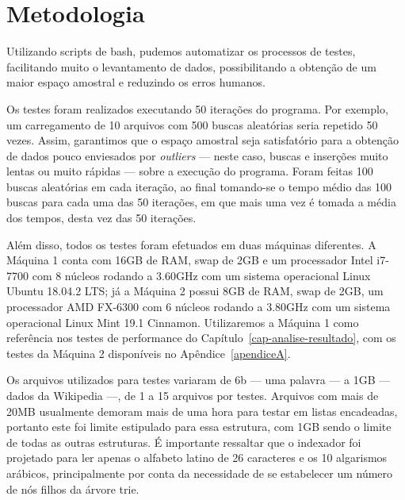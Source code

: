 \chapter{Metodologia}\label{cap-metodologia}


Utilizando scripts de bash, pudemos automatizar os processos de testes, facilitando muito o levantamento de dados, possibilitando a obtenção de um maior espaço amostral e reduzindo os erros humanos. 

Os testes foram realizados executando 50 iterações do programa. Por exemplo, um carregamento de 10 arquivos com 500 buscas aleatórias seria repetido 50 vezes. Assim, garantimos que o espaço amostral seja satisfatório para a obtenção de dados pouco enviesados por \textit{outliers} --- neste caso, buscas e inserções muito lentas ou muito rápidas --- sobre a execução do programa. Foram feitas 100 buscas aleatórias em cada iteração, ao final tomando-se o tempo médio das 100 buscas para cada uma das 50 iterações, em que mais uma vez é tomada a média dos tempos, desta vez das 50 iterações.

Além disso, todos os testes foram efetuados em duas máquinas diferentes. A Máquina 1 conta com 16GB de RAM, swap de 2GB e um processador Intel i7-7700 com 8 núcleos rodando a 3.60GHz com um sistema operacional Linux Ubuntu 18.04.2 LTS; já a Máquina 2 possui 8GB de RAM, swap de 2GB, um processador AMD FX-6300 com 6 núcleos rodando a 3.80GHz com um sistema operacional Linux Mint 19.1 Cinnamon. Utilizaremos a Máquina 1 como referência nos testes de performance do Capítulo~\ref{cap-analise-resultado}, com os testes da Máquina 2 disponíveis no Apêndice~\ref{apendiceA}.

Os arquivos utilizados para testes variaram de 6b --- uma palavra --- a 1GB --- dados da Wikipedia ---, de 1 a 15 arquivos por testes. Arquivos com mais de 20MB usualmente demoram mais de uma hora para testar em listas encadeadas, portanto este foi limite estipulado para essa estrutura, com 1GB sendo o limite de todas as outras estruturas. É importante ressaltar que o indexador foi projetado para ler apenas o alfabeto latino de 26 caracteres e os 10 algarismos arábicos, principalmente por conta da necessidade de se estabelecer um número de nós filhos da árvore trie.


\begin{comment}

A Figura \ref{fig:graf} exemplifica o uso de uma figura gráfica no texto.

\begin{figure}[!htb]
\centering
  \caption{Exemplo de inserção de figura}
  \label{fig:graf}
\end{figure}
\end{comment}
